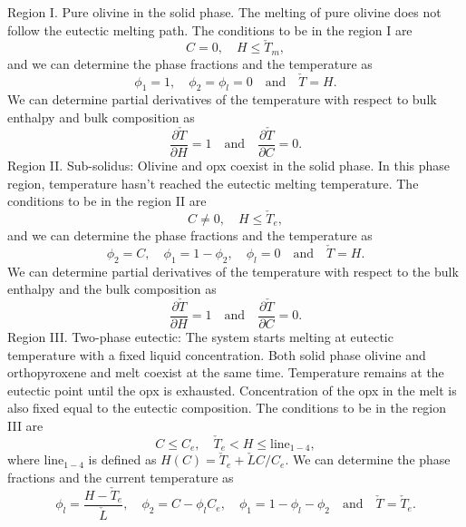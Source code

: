 Region I. Pure olivine in the solid phase. The melting of pure olivine does not follow the eutectic
melting path. The conditions to be in the region I are
\begin{equation}
		  C = 0,  \quad H \leq \check{T}_m,
\end{equation}
and we can determine the phase fractions and the temperature as
\begin{equation}
\phi_{1} = 1, \quad \phi_{2} = \phi_l = 0 \quad \text{and} 
		  \quad \check{T} = H.
\end{equation}
We can determine partial derivatives of the temperature with respect to bulk enthalpy and bulk composition as
\begin{equation}
\frac{\partial\check{T}}{\partial H} = 1 \quad \text{and} \quad \frac{\partial\check{T}}{\partial C} = 0.
\end{equation}
Region II. Sub-solidus: Olivine and opx coexist in the solid phase.
In this phase region, temperature hasn't reached the eutectic melting temperature.
The conditions to be in the region II are
\begin{equation}
		  C \neq 0, \quad H \leq \check{T}_e,
\end{equation}
and we can determine the phase fractions and the temperature as
\begin{equation}
\phi_{2} = C, \quad \phi_1 = 1-\phi_2,
		  \quad \phi_l = 0 \quad \text{and} \quad 
		  \check{T} = H .
\end{equation}
We can determine partial derivatives of the temperature with respect to the bulk enthalpy and the bulk composition as
\begin{equation}
\frac{\partial\check{T}}{\partial H} = 1 \quad \text{and} \quad \frac{\partial\check{T}}{\partial C} = 0.
\end{equation}
Region III. Two-phase eutectic: The system starts melting at eutectic temperature
with a fixed liquid concentration.
Both solid phase olivine and orthopyroxene and melt coexist at the same time.
Temperature remains at the eutectic point until the opx is exhausted. 
Concentration of the opx in the melt is also fixed equal to the eutectic composition.
The conditions to be in the region III are
\begin{equation}
		  C \leq C_e, \quad 
		  \check{T}_e < H \leq \text{line}_{1-4},
\end{equation}
where $\text{line}_{1-4}$ is defined as $H(C) = \check{T}_e + \check{L} C/C_e$.
We can determine the phase fractions and the current temperature as
\begin{equation}
		  \phi_l = \frac{H - \check{T}_e}{\check{L}}, \quad
		  \phi_2 = C - \phi_l C_e, \quad
		  \phi_1 = 1- \phi_l - \phi_2 \quad
		  \text{and} \quad \check{T} = \check{T}_e.
\end{equation}
